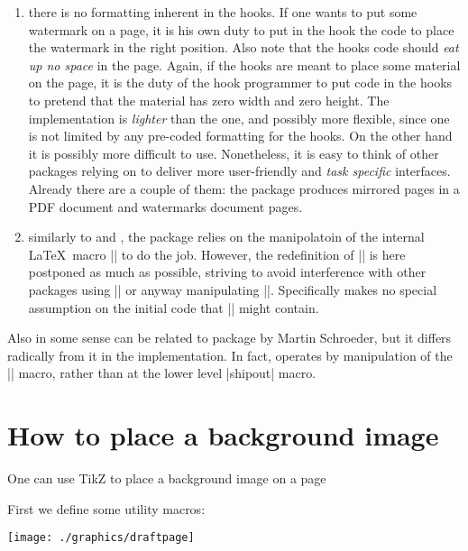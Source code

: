  \begin{enumerate}
 \item there is no formatting inherent in the hooks. If one wants to
   put some watermark on a page, it is his own duty to put in the
   hook the code to place the watermark in the right position. Also
   note that the hooks code should \emph{eat up no space} in the
   page.  Again, if the hooks are meant to place some material on the
   page, it is the duty of the hook programmer to put code in the
   hooks to pretend that the material has zero width and zero height.
   The implementation is \emph{lighter} than the  one,
   and possibly more flexible, since one is not limited by any
   pre-coded formatting for the hooks. On the other hand it is
   possibly more difficult to use. Nonetheless, it is easy to think
   of other packages relying on  to deliver more
   user-friendly and \emph{task specific} interfaces. Already there
   are a couple of them: the package  produces
   mirrored pages in a PDF document and 
   watermarks document pages.
 \item similarly to  and , the
   package relies on the manipolatoin of the internal \LaTeX\ macro
   |\@begindvi| to do the job. However, the redefinition of
   |\@begindvi| is here postponed as much as possible, striving to
   avoid interference with other packages using |\AtBeginDvi| or
   anyway manipulating |\@begindvi|. Specifically 
   makes no special assumption on the initial code that |\@begindvi|
   might contain.
 \end{enumerate}



Also in some sense  can be related to package
  by Martin Schroeder, but it differs radically from
 it in the implementation. In fact, operates by
 manipulation of the |\@begindvi| macro, rather than at the
 lower level |shipout| macro.


\section{How to place a background image}

One can use TikZ to place a background image on a page

First we define some utility macros:
\begin{marginfigure}%
  \texttt{[image: ./graphics/draftpage]}
  \label{fig:draftpage}
\end{marginfigure}



